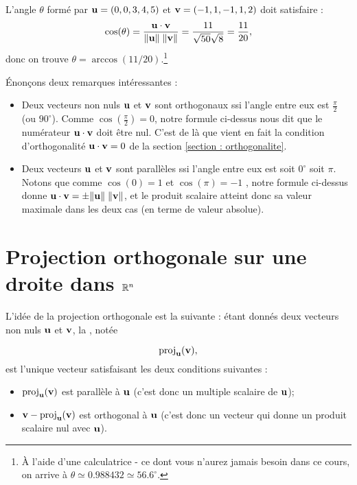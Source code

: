 \begin{myexample}
L'angle $\theta$ formé par $\mathbf{u} = (0,0,3,4,5)$ et $\mathbf{v} = (-1,1,-1,1,2)$ doit satisfaire :
$$
\cos(\theta) = \frac{\mathbf{u} \cdot \mathbf{v}}{\Vert \mathbf{u} \Vert\; \Vert \mathbf{v} \Vert}
= \frac{11}{\sqrt{50}\sqrt{8}} = \frac{11}{20},
$$
donc on trouve $\theta = \arccos(11/20)$.\footnote{\`A l'aide d'une calculatrice - ce dont vous n'aurez jamais besoin dans ce cours, on arrive à $\theta \simeq 0.988432\simeq56.6^\circ$.}
\end{myexample}

Énonçons deux remarques intéressantes :
\begin{itemize}
\item Deux vecteurs non nuls $\mathbf{u}$ et $\mathbf{v}$ sont orthogonaux ssi l'angle entre eux est $\frac{\pi}2$ (ou $90^\circ$).  Comme $\cos(\frac{\pi}2) = 0$, notre formule ci-dessus nous dit que
le numérateur $\mathbf{u} \cdot \mathbf{v}$ doit être nul.  C'est de là que vient en fait la
condition d'orthogonalité $\mathbf{u} \cdot \mathbf{v}=0$ de la section \ref{section : orthogonalite}.
\item Deux vecteurs $\mathbf{u}$ et $\mathbf{v}$ sont parallèles ssi l'angle entre eux est soit $0^\circ$ soit $\pi$.  Notons que comme $\cos(0) = 1$ et
$\cos(\pi) = -1$ , notre formule ci-dessus donne $\mathbf{u} \cdot \mathbf{v} = \pm \Vert \mathbf{u} \Vert\; \Vert \mathbf{v} \Vert$, et le produit scalaire atteint donc sa valeur maximale dans les deux cas (en terme de valeur absolue).
\end{itemize}




\section{Projection orthogonale sur une droite dans \texorpdfstring{$\mathbb{R}^n$}{Rn}}
\label{section : projection orthogonale sur une droite dans Rn}
 
L'idée de la 
projection orthogonale est la suivante : étant donnés deux vecteurs non nuls $\mathbf{u}$ et $\mathbf{v}$,
 la , notée

  
$$
 \operatorname{proj}_{\mathbf{u}}(\mathbf{v}),
$$ 
est l'unique vecteur satisfaisant les deux conditions suivantes :
\begin{itemize}\label{propOrthogProj}
\item $\operatorname{proj}_{\mathbf{u}}(\mathbf{v})$ est parallèle à  
$\mathbf{u}$ (c'est donc un multiple scalaire de $\mathbf{u}$);
\item $\mathbf{v} - \operatorname{proj}_{\mathbf{u}}(\mathbf{v})$ est orthogonal à $\mathbf{u}$ (c'est donc un vecteur qui donne un produit scalaire nul avec $\mathbf{u}$).
\end{itemize}
 
